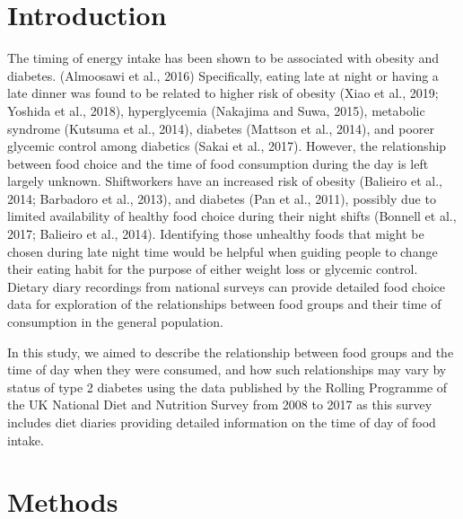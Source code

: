 \documentclass[utf8]{frontiersSCNS}
\begin{document}
\hypertarget{introduction}{%
\section*{Introduction}\label{introduction}}

The timing of energy intake has been shown to be associated with obesity
and diabetes. (Almoosawi et al., 2016) Specifically, eating late at
night or having a late dinner was found to be related to higher risk of
obesity (Xiao et al., 2019; Yoshida et al., 2018), hyperglycemia
(Nakajima and Suwa, 2015), metabolic syndrome (Kutsuma et al., 2014),
diabetes (Mattson et al., 2014), and poorer glycemic control among
diabetics (Sakai et al., 2017). However, the relationship between food
choice and the time of food consumption during the day is left largely
unknown. Shiftworkers have an increased risk of obesity (Balieiro et
al., 2014; Barbadoro et al., 2013), and diabetes (Pan et al., 2011),
possibly due to limited availability of healthy food choice during their
night shifts (Bonnell et al., 2017; Balieiro et al., 2014). Identifying
those unhealthy foods that might be chosen during late night time would
be helpful when guiding people to change their eating habit for the
purpose of either weight loss or glycemic control. Dietary diary
recordings from national surveys can provide detailed food choice data
for exploration of the relationships between food groups and their time
of consumption in the general population.

In this study, we aimed to describe the relationship between food groups
and the time of day when they were consumed, and how such relationships
may vary by status of type 2 diabetes using the data published by the
Rolling Programme of the UK National Diet and Nutrition Survey from 2008
to 2017 as this survey includes diet diaries providing detailed
information on the time of day of food intake.

\hypertarget{methods}{%
\section*{Methods}\label{methods}}
\end{document}
